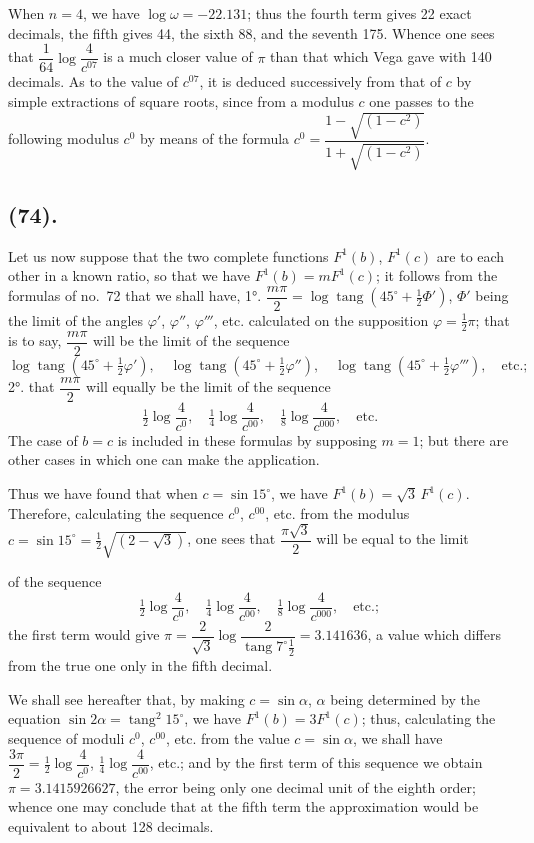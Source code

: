 \documentclass{article}
\begin{document}
When $n=4$, we have $\log\omega=-22.131$; thus the fourth term gives 22 exact decimals, the fifth gives 44, the sixth 88, and the seventh 175. Whence one sees that $\dfrac{1}{64}\log\dfrac{4}{c^{07}}$ is a much closer value of $\pi$ than that which Vega gave with 140 decimals. As to the value of $c^{07}$, it is deduced successively from that of $c$ by simple extractions of square roots, since from a modulus $c$ one passes to the following modulus $c^{0}$ by means of the formula $c^{0}=\dfrac{1-\sqrt{(1-c^{2})}}{1+\sqrt{(1-c^{2})}}$.

\subsection*{(74).}

Let us now suppose that the two complete functions $F^{1}(b)$, $F^{1}(c)$ are to each other in a known ratio, so that we have $F^{1}(b)=mF^{1}(c)$; it follows from the formulas of no.~72 that we shall have, 1°. $\dfrac{m\pi}{2}=\log\operatorname{tang}(45^{\circ}+\frac{1}{2}\Phi')$, $\Phi'$ being the limit of the angles $\varphi'$, $\varphi''$, $\varphi'''$, etc. calculated on the supposition $\varphi=\frac{1}{2}\pi$; that is to say, $\dfrac{m\pi}{2}$ will be the limit of the sequence
\[ \log\operatorname{tang}(45^{\circ}+\tfrac{1}{2}\varphi'),\quad \log\operatorname{tang}(45^{\circ}+\tfrac{1}{2}\varphi''),\quad \log\operatorname{tang}(45^{\circ}+\tfrac{1}{2}\varphi'''),\quad \text{etc.}; \]
2°. that $\dfrac{m\pi}{2}$ will equally be the limit of the sequence
\[ \tfrac{1}{2}\log\frac{4}{c^{0}},\quad \tfrac{1}{4}\log\frac{4}{c^{00}},\quad \tfrac{1}{8}\log\frac{4}{c^{000}},\quad \text{etc.} \]
The case of $b=c$ is included in these formulas by supposing $m=1$; but there are other cases in which one can make the application.

Thus we have found that when $c=\sin15^{\circ}$, we have $F^{1}(b)=\sqrt{3}\,F^{1}(c)$. Therefore, calculating the sequence $c^{0}$, $c^{00}$, etc. from the modulus $c=\sin15^{\circ}=\frac{1}{2}\sqrt{(2-\sqrt{3})}$, one sees that $\dfrac{\pi\sqrt{3}}{2}$ will be equal to the limit

of the sequence
\[ \tfrac{1}{2}\log\frac{4}{c^{0}},\quad \tfrac{1}{4}\log\frac{4}{c^{00}},\quad \tfrac{1}{8}\log\frac{4}{c^{000}},\quad \text{etc.}; \]
the first term would give $\pi=\dfrac{2}{\sqrt{3}}\log\dfrac{2}{\operatorname{tang}7^{\circ}\frac{1}{2}}=3.141636$, a value which differs from the true one only in the fifth decimal.

We shall see hereafter that, by making $c=\sin\alpha$, $\alpha$ being determined by the equation $\sin2\alpha=\operatorname{tang}^{2}15^{\circ}$, we have $F^{1}(b)=3F^{1}(c)$; thus, calculating the sequence of moduli $c^{0}$, $c^{00}$, etc. from the value $c=\sin\alpha$, we shall have $\dfrac{3\pi}{2}=\frac{1}{2}\log\dfrac{4}{c^{0}}$, $\frac{1}{4}\log\dfrac{4}{c^{00}}$, etc.; and by the first term of this sequence we obtain $\pi=3.1415926627$, the error being only one decimal unit of the eighth order; whence one may conclude that at the fifth term the approximation would be equivalent to about 128 decimals.
\end{document}
